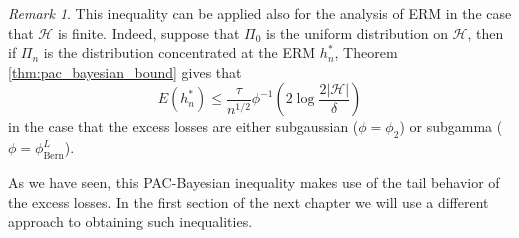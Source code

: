 \documentclass{uvamath}
\newcommand*{\calH}{\mathcal{H}}
\newcommand*{\prob}[2][]{\mathbb{P}_{#1}\left\{#2\right\}}
\newcommand*{\paren}[1]{\left(#1\right)}
\newcommand*{\rme}{\mathrm{e}}
\theoremstyle{remark}
\newtheorem{remark}[theorem]{Remark}
\theoremstyle{definition}
\theoremstyle{definition}
\theoremstyle{definition}
\theoremstyle{definition}
\theoremstyle{definition}
\begin{document}
\begin{remark}
  This inequality can be applied also for the analysis of ERM in the
  case that $\calH$ is finite. Indeed, suppose that $\Pi_0$ is the
  uniform distribution on $\calH$, then if $\Pi_n$ is the distribution
  concentrated at the ERM $h^*_n$, Theorem
  \ref{thm:pac_bayesian_bound} gives that
  \begin{equation*}
    E(h^*_n) \leq
    \frac{\tau}{n^{1/2}}\phi^{-1}\paren{2\log\frac{2|\calH|}{\delta}}
  \end{equation*}
  in the case that the excess losses are either subgaussian ($\phi =
  \phi_2$) or subgamma ($\phi = \phi_{\text{Bern}}^L$).
\end{remark}

As we have seen, this PAC-Bayesian inequality makes use of the tail
behavior of the excess losses. In the first section of the next
chapter we will use a different approach to obtaining such
inequalities.




\end{document}
